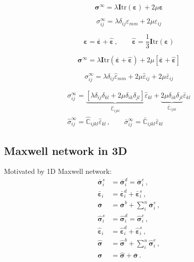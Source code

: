 \documentclass[12pt]{article}
\newcommand{\tr}{\text{tr}}
\begin{document}
\begin{equation}
\bm{\sigma}^{\infty} = \lambda \bm{I}\tr\left(\bm{\varepsilon}\right) + 2\mu \bm{\varepsilon}
\end{equation}

\begin{equation}
\sigma_{ij}^{\infty} = \lambda \delta_{ij}\varepsilon_{mm} + 2\mu \varepsilon_{ij}
\end{equation}


\begin{equation}
\bm{\varepsilon} = \bar{\bm{\varepsilon}} + \hat{\bm{\varepsilon}} \,, \qquad \hat{\bm{\varepsilon}} = \dfrac{1}{3}\bm{I} \tr\left(\bm{\varepsilon}\right)
\end{equation}

\begin{equation}
\bm{\sigma}^{\infty} = \lambda \bm{I}\tr\left(\bar{\bm{\varepsilon}} + \hat{\bm{\varepsilon}}\right) + 2\mu \left[\bar{\bm{\varepsilon}} + \hat{\bm{\varepsilon}}\right]
\end{equation}

\begin{equation}
\sigma_{ij}^{\infty} = \lambda \delta_{ij} \hat{\varepsilon}_{mm} + 2\mu \hat{\varepsilon}_{ij} + 2\mu \bar{\varepsilon}_{ij}
\end{equation}


\begin{equation}
\begin{aligned}
\sigma_{ij}^{\infty} = \underbrace{\left[\lambda \delta_{ij} \delta_{kl}  + 2\mu \delta_{ik} \delta_{jl}\right]}_{\hat{\mathbb{C}}_{ijkl}} \hat{\varepsilon}_{kl} + \underbrace{2\mu \delta_{ik} \delta_{jl}}_{\bar{\mathbb{C}}_{ijkl}} \bar{\varepsilon}_{kl}\\
\hat{\sigma}_{ij}^{\infty} = \hat{\mathbb{C}}_{ijkl}\hat{\varepsilon}_{kl}\,,\qquad \bar{\sigma}_{ij}^{\infty}= \bar{\mathbb{C}}_{ijkl} \bar{\varepsilon}_{kl}
\end{aligned}
\end{equation}


\subsection{Maxwell network in 3D}
Motivated by 1D Maxwell network:
\begin{align}
	\bar{\bm{\sigma}}^{s}_{i} &= \bar{\bm{\sigma}}^{d}_{i} = \bar{\bm{\sigma}}^{e}_{i}\,,\\
	\bar{\bm{\varepsilon}}_{i} &= \bar{\bm{\varepsilon}}^{d}_{i} + \bar{\bm{\varepsilon}}^{s}_{i}\,,\\
	\bar{\bm{\sigma}} & = \bar{\bm{\sigma}}^{b} + \sum_{i}^{n}\bar{\bm{\sigma}}^{e}_{i}\,,\\
	\hat{\bm{\sigma}}^{s}_{i} &= \hat{\bm{\sigma}}^{d}_{i} = \hat{\bm{\sigma}}^{e}_{i}\,,\\
	\hat{\bm{\varepsilon}}_{i} &= \hat{\bm{\varepsilon}}^{d}_{i} + \hat{\bm{\varepsilon}}^{s}_{i}\,,\\
	\hat{\bm{\sigma}} & = \hat{\bm{\sigma}}^{b} + \sum_{i}^{n}\hat{\bm{\sigma}}^{e}_{i}\,,\\
	\bm{\sigma} &=\hat{\bm{\sigma}} +\bar{\bm{\sigma}}\,.
\end{align}
\end{document}
